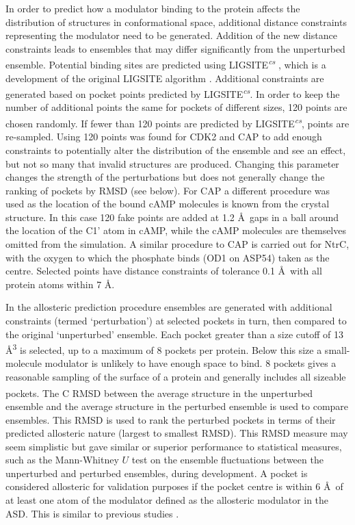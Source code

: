 In order to predict how a modulator binding to the protein affects the distribution of structures in conformational space, additional distance constraints representing the modulator need to be generated.
Addition of the new distance constraints leads to ensembles that may differ significantly from the unperturbed ensemble.
Potential binding sites are predicted using LIGSITE\textsuperscript{\it cs} \cite{Huang2006}, which is a development of the original LIGSITE algorithm \cite{Hendlich1997}.
Additional constraints are generated based on pocket points predicted by LIGSITE\textsuperscript{\it cs}.
In order to keep the number of additional points the same for pockets of different sizes, 120 points are chosen randomly.
If fewer than 120 points are predicted by LIGSITE\textsuperscript{\it cs}, points are re-sampled.
Using 120 points was found for CDK2 and CAP to add enough constraints to potentially alter the distribution of the ensemble and see an effect, but not so many that invalid structures are produced.
Changing this parameter changes the strength of the perturbations but does not generally change the ranking of pockets by RMSD (see below).
For CAP a different procedure was used as the location of the bound cAMP molecules is known from the crystal structure.
In this case 120 fake points are added at 1.2 \AA\ gaps in a ball around the location of the C1' atom in cAMP, while the cAMP molecules are themselves omitted from the simulation.
A similar procedure to CAP is carried out for NtrC, with the oxygen to which the phosphate binds (OD1 on ASP54) taken as the centre.
Selected points have distance constraints of tolerance 0.1 \AA\ with all protein atoms within 7 \AA.

In the allosteric prediction procedure ensembles are generated with additional constraints (termed `perturbation') at selected pockets in turn, then compared to the original `unperturbed' ensemble.
Each pocket greater than a size cutoff of 13 \AA\textsuperscript{3} is selected, up to a maximum of 8 pockets per protein.
Below this size a small-molecule modulator is unlikely to have enough space to bind.
8 pockets gives a reasonable sampling of the surface of a protein and generally includes all sizeable pockets.
The C\textsuperscript{\textalpha} RMSD between the average structure in the unperturbed ensemble and the average structure in the perturbed ensemble is used to compare ensembles.
This RMSD is used to rank the perturbed pockets in terms of their predicted allosteric nature (largest to smallest RMSD).
This RMSD measure may seem simplistic but gave similar or superior performance to statistical measures, such as the Mann-Whitney $U$ test on the ensemble fluctuations between the unperturbed and perturbed ensembles, during development.
A pocket is considered allosteric for validation purposes if the pocket centre is within 6 \AA\ of at least one atom of the modulator defined as the allosteric modulator in the ASD.
This is similar to previous studies \cite{Panjkovich2012}.


